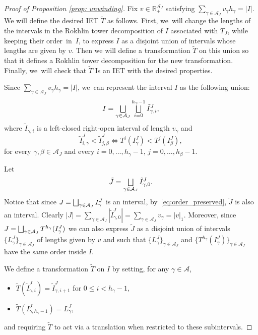 \documentclass[10pt,a4paper]{amsart}
\let\oldbigsqcup\bigsqcup
\renewcommand{\bigsqcup}{\mathop{\textstyle\oldbigsqcup}\displaylimits}
\theoremstyle{plain}
\theoremstyle{definition}
\newcommand{\A}{\mathcal{A}}
\newcommand{\R}{\mathbb{R}}
\begin{document}
\begin{proof}[Proof of Proposition \ref{prop: unwinding}]
Fix $v \in \R^{\A_J}_+$ satisfying $\sum_{\gamma \in \A_J} v_\gamma h_\gamma = |I|$. We will define the desired IET $\tilde T$ as follows. First, we~will change the lengths of the intervals in the Rokhlin tower decomposition of $I$ associated with $T_J$, while keeping their order~in~$I$, to express $I$ as a disjoint union of intervals whose lengths are given by $v$. Then we will define a transformation $\tilde T$ on this union so that it defines a Rokhlin tower decomposition for the new transformation. Finally, we~will check that $\tilde T$ Is an IET with the desired properties.

Since $\sum_{\gamma \in \A_J} v_\gamma h_\gamma = |I|$, we~can represent the interval $I$ as the following union:
\begin{equation}
\label{eq:modified_towers}
I = \bigsqcup_{\gamma \in \A_J} \bigsqcup_{i = 0}^{h_\gamma - 1} \tilde I_{\gamma, i}^J,
\end{equation}
where $\tilde I_{\gamma, i}$ is a left-closed right-open interval of length $v_\gamma$ and
\begin{equation}\label{eq:order_preserved}
\tilde I_{i, \gamma}^J < \tilde I_{j, \beta}^J \iff T^i(I_\gamma^J) < T^j(I_\beta^J),
\end{equation}
for every $\gamma,\beta\in \A_J$ and every $i=0,\ldots, h_\gamma -1$, $j=0,\ldots, h_{\beta}-1$.

Let
\[
\tilde J = \bigsqcup_{\gamma \in \A_J} \tilde I_{\gamma, 0}^J.
\]
Notice that since $J = \bigsqcup_{\gamma \in \A_J} I_{\gamma}^J$ is an interval, by~\eqref{eq:order_preserved}, $\tilde J$ is also an interval. Clearly $|J| = \sum_{\gamma \in \A_J} |\tilde I_{\gamma, 0}^J| = \sum_{\gamma \in \A_J} v_\gamma = |v|_1$. Moreover, since $J = \bigsqcup_{\gamma \in \A_J} T^{h_\gamma}(I_{\gamma}^J)$ we can also express $\tilde J$ as a disjoint union of intervals $\{L^J_{\gamma}\}_{\gamma \in \A_J}$ of lengths given by $v$ and such that $\{L^J_{\gamma}\}_{\gamma \in \A_J}$ and $\{T^{h_\gamma}(I_{\gamma}^J)\}_{\gamma \in \A_J}$ have the same order inside $I$.

We define a transformation $\tilde T$ on $I$ by setting, for any $\gamma \in \A$,
\begin{itemize}
\item $\tilde{T}(\tilde I^J_{\gamma,i})=\tilde I^J_{\gamma,i+1}$ for $0\le i<h_{\gamma}-1$, \item $\tilde T(I^J_{\gamma, h_\gamma - 1}) = L_\gamma^J$,
\end{itemize}
and requiring $\tilde T$ to act via a translation when restricted to these subintervals.


\end{proof}
\end{document}
